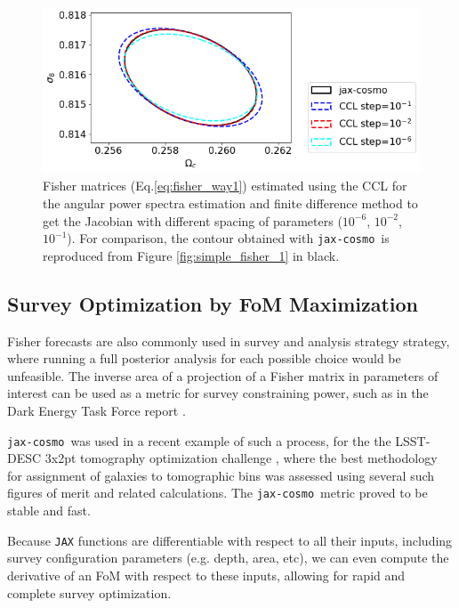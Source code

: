 \documentclass[twocolumn,twocolappendix,nofootinbib,iop]{openjournal}
\newcommand{\FrL}[1]{{\color{cyan}FL: #1}}
\newcommand{\jaxcosmo}{\texttt{jax-cosmo}}
\begin{document}
\begin{figure}
    \centering
    \includegraphics[width=\columnwidth]{figures/simple_fisher_2.png}
    \caption{Fisher matrices (Eq.\ref{eq:fisher_way1}) estimated using the CCL for the angular power spectra estimation and finite difference method to get the Jacobian  with different spacing of parameters ($10^{-6}$, $10^{-2}$, $10^{-1}$). For comparison, the contour obtained with \jaxcosmo\ is reproduced from Figure \ref{fig:simple_fisher_1} in black.} 
    \label{fig:simple_fisher_2}
\end{figure}

%
\subsection{Survey Optimization by FoM Maximization}
\label{sec-FOM-optimisation}
Fisher forecasts are also commonly used in survey and analysis strategy strategy, where running a full posterior analysis for each possible choice would be unfeasible. The inverse area of a projection of a Fisher matrix in parameters of interest can be used as a metric for survey constraining power, such as in the Dark Energy Task Force report \citep{2006astro.ph..9591A}.

\jaxcosmo\ was used in a recent example of such a process, for the  the LSST-DESC 3x2pt tomography optimization challenge \citep{2021OJAp....4E..13Z}, where the best methodology for assignment of galaxies to tomographic bins was assessed using several such figures of merit and related calculations. The \jaxcosmo\ metric proved to be stable and fast.

Because \texttt{JAX} functions are differentiable with respect to all their inputs, including survey configuration parameters (e.g. depth, area, etc), we can even compute the derivative of an FoM with respect to these inputs, allowing for rapid and complete survey optimization.
\end{document}
